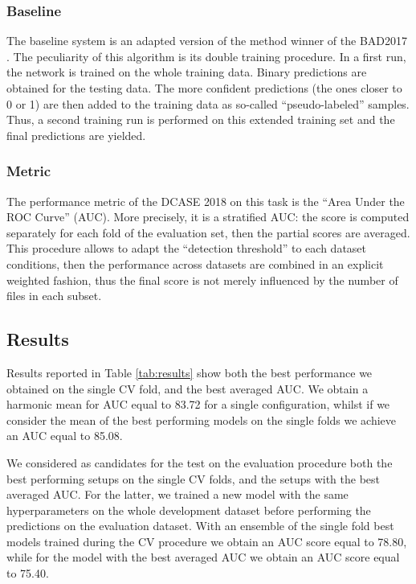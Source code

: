 \subsubsection{Baseline}
The baseline system is an adapted version of the method winner of the BAD2017 \cite{grill2017two}. The peculiarity of this algorithm is its double training procedure. In a first run, the network is trained on the whole training data. Binary predictions are obtained for the testing data. The more confident predictions (the ones closer to 0 or 1) are then added to the training data as so-called ``pseudo-labeled'' samples. Thus, a second training run is performed on this extended training set and the final predictions are yielded.


\subsubsection{Metric}
The performance metric of the DCASE 2018 on this task is the ``Area Under the ROC Curve'' (AUC). More precisely, it is a stratified AUC: the score is computed separately for each fold of the evaluation set, then the partial scores are averaged. This procedure allows to adapt the ``detection threshold'' to each dataset conditions, then the performance across datasets are combined in an explicit weighted fashion, thus the final score is not merely influenced by the number of files in each subset.


\subsection{Results}
Results reported in Table \ref{tab:results} show both the best performance we obtained on the single CV fold, and the best averaged AUC. We obtain a harmonic mean for AUC equal to 83.72 for a single configuration, whilst if we consider the mean of the best performing models on the single folds we achieve an AUC equal to 85.08.

We considered as candidates for the test on the evaluation procedure \cite{stowell2018automatic} both the best performing setups on the single CV folds, and the setups with the best averaged AUC. For the latter, we trained a new model with the same hyperparameters on the whole development dataset before performing the predictions on the evaluation dataset. With an ensemble of the single fold best models trained during the CV procedure we obtain an AUC score equal to 78.80, while for the model with the best averaged AUC we obtain an AUC score equal to 75.40.
 

